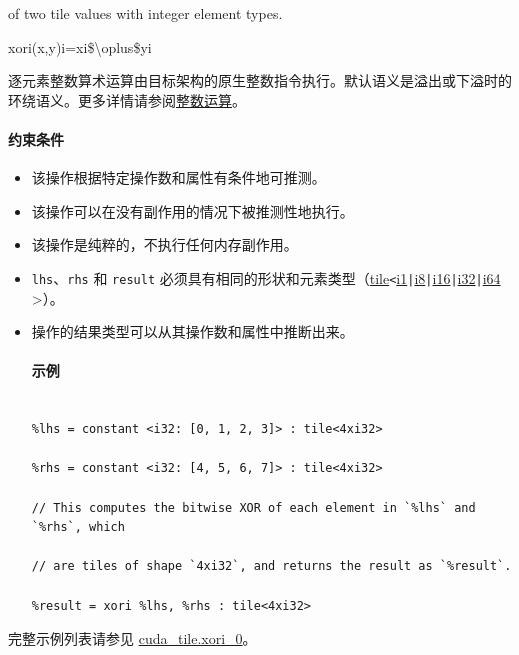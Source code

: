 \documentclass{article}
\begin{document}
of two tile values with integer element types.




xori(x,y)i=xi\$\textbackslash{}oplus\$yi


逐元素整数算术运算由目标架构的原生整数指令执行。默认语义是溢出或下溢时的环绕语义。更多详情请参阅\href{https://docs.nvidia.com/cuda/tile-ir/latest/sections/operations.html#op-group-integer}{整数运算}。





\paragraph{约束条件}


\begin{itemize}
\item 该操作根据特定操作数和属性有条件地可推测。
\item 该操作可以在没有副作用的情况下被推测性地执行。
\item 该操作是纯粹的，不执行任何内存副作用。
\item \texttt{lhs}、\texttt{rhs} 和 \texttt{result} 必须具有相同的形状和元素类型（\href{https://docs.nvidia.com/cuda/tile-ir/latest/sections/types.html#type-tile}{tile}\texttt{<}\href{https://docs.nvidia.com/cuda/tile-ir/latest/sections/types.html#subsection-element-types}{i1}\texttt{|}\href{https://docs.nvidia.com/cuda/tile-ir/latest/sections/types.html#subsection-element-types}{i8}\texttt{|}\href{https://docs.nvidia.com/cuda/tile-ir/latest/sections/types.html#subsection-element-types}{i16}\texttt{|}\href{https://docs.nvidia.com/cuda/tile-ir/latest/sections/types.html#subsection-element-types}{i32}\texttt{|}\href{https://docs.nvidia.com/cuda/tile-ir/latest/sections/types.html#subsection-element-types}{i64} >）。
\item 操作的结果类型可以从其操作数和属性中推断出来。




\paragraph{示例}


\begin{lstlisting}

%lhs = constant <i32: [0, 1, 2, 3]> : tile<4xi32>

%rhs = constant <i32: [4, 5, 6, 7]> : tile<4xi32>

// This computes the bitwise XOR of each element in `%lhs` and `%rhs`, which

// are tiles of shape `4xi32`, and returns the result as `%result`.

%result = xori %lhs, %rhs : tile<4xi32>

\end{lstlisting}



\end{itemize}
完整示例列表请参见 \href{https://docs.nvidia.com/cuda/tile-ir/latest/sections/appendix.html#example-cuda-tile-xori-0}{cuda\_tile.xori\_0}。
\end{document}
